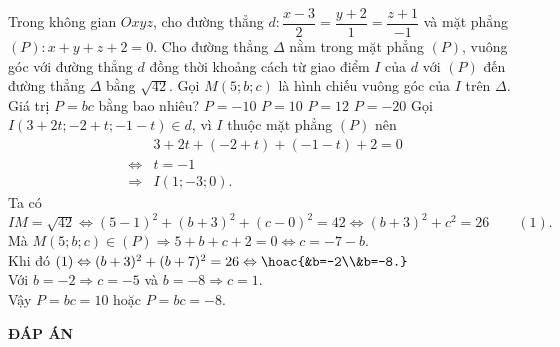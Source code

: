 \begin{ex}%
	Trong không gian $Oxyz$, cho đường thẳng $d\colon\dfrac{x-3}{2}=\dfrac{y+2}{1}=\dfrac{z+1}{-1}$ và mặt phẳng $(P)\colon x+y+z+2=0$. Cho đường thẳng $\Delta$ nằm trong mặt phẳng $(P)$, vuông góc với đường thẳng $d$ đồng thời khoảng cách từ giao điểm $I$ của $d$ với $(P)$ đến đường thẳng $\Delta$ bằng $\sqrt{42}$. Gọi $M(5;b;c)$ là hình chiếu vuông góc của $I$ trên $\Delta$. Giá trị $P=bc$ bằng bao nhiêu?
	\choice
	{$P=-10$}
	{\True $P=10$}
	{$P=12$}
	{$P=-20$}
	\loigiai
	{
		Gọi $I(3+2t;-2+t;-1-t) \in d$, vì $I$ thuộc mặt phẳng $(P)$ nên 
		\begin{eqnarray*}
			& &3+2t+(-2+t)+(-1-t)+2=0 \\
			& \Leftrightarrow & t=-1\\
			& \Rightarrow & I(1;-3;0).
		\end{eqnarray*} 
	Ta có $IM=\sqrt{42}\Leftrightarrow (5-1)^2+(b+3)^2+(c-0)^2=42\Leftrightarrow(b+3)^2+c^2=26\qquad(1).$\\
	Mà $M(5;b;c) \in (P)\Rightarrow 5+b+c+2=0 \Leftrightarrow c=-7-b.$\\
	Khi đó $(1)\Leftrightarrow (b+3)^2+(b+7)^2=26 \Leftrightarrow\hoac{&b=-2\\&b=-8.}$\\
	Với $b=-2\Rightarrow c=-5$ và $b=-8\Rightarrow c=1.$\\
	Vậy $P=bc=10$ hoặc $P=bc=-8$.
	}
\end{ex}
\newpage
\begin{center}
	\textbf{ĐÁP ÁN}
\end{center}
\begin{multicols}{10}
	 
\end{multicols}